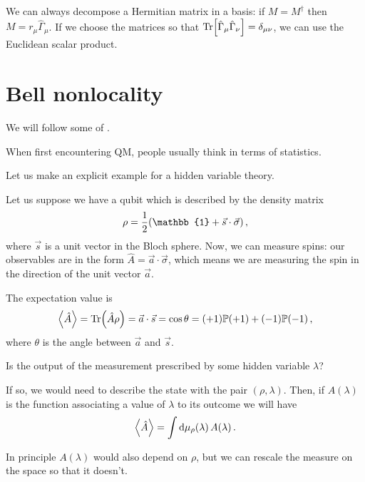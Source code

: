 \documentclass[main.tex]{subfiles}
\begin{document}

We can always decompose a Hermitian matrix in a basis: if \(M = M ^\dag\) then \(M = r_{\mu } \hat{\Gamma}_{\mu } \).
If we choose the matrices so that \(\Tr [\hat{\Gamma}_{\mu } \hat{\Gamma}_{\nu }] = \delta_{\mu \nu }\), we can use the Euclidean scalar product. 

\section{Bell nonlocality}

We will follow some of  \cite[]{brunnerBellNonlocality2014}. 

When first encountering QM, people usually think in terms of statistics. 

Let us make an explicit example for a hidden variable theory. 

Let us suppose we have a qubit which is described by the density matrix 
%
\begin{align}
\rho = \frac{1}{2} \qty(\mathbb{1} + \vec{s} \cdot \vec{\sigma})
\,,
\end{align}
%
where \(\vec{s}\) is a unit vector in the Bloch sphere. 
Now, we can measure spins: our observables are in the form \(\hat{A} = \vec{a} \cdot \vec{\sigma}\), which means we are measuring the spin in the direction of the unit vector \(\vec{a}\). 

The expectation value is 
%
\begin{align}
\expval{\hat{A}} = \Tr (\hat{A} \rho ) = \vec{a} \cdot \vec{s}
= \cos \theta  = (+1) \mathbb{P} (+1) + (-1) \mathbb{P}(-1)
\,,
\end{align}
%
where \(\theta \) is the angle between \(\vec{a}\) and \(\vec{s}\). 

Is the output of the measurement prescribed by some hidden variable \(\lambda \)?

If so, we would need to describe the state with the pair \((\rho , \lambda )\). Then, if \(A(\lambda )\) is the function associating a value of \(\lambda \) to its outcome we will have 
%
\begin{align}
\expval{\hat{A}} = \int \dd{\mu_{\rho }(\lambda )} A(\lambda )
\,.
\end{align}

In principle \(A(\lambda )\) would also depend on \(\rho \), but we can rescale the measure on the space so that it doesn't. 
\end{document}

